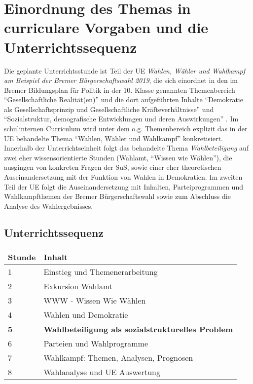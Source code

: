 


\section{Einordnung des Themas in curriculare Vorgaben und die Unterrichtssequenz}

Die geplante Unterrichtsstunde ist Teil der UE \emph{Wahlen, Wähler und
Wahlkampf am  Beispiel der Bremer Bürgerschaftswahl 2019}, die sich einordnet
in den im Bremer Bildungsplan für Politik in der 10. Klasse genannten
Themenbereich \enquote{Gesellschaftliche Realität(en)} und die dort
aufgeführten Inhalte \enquote{Demokratie als Gesellschaftsprinzip und
Gesellschaftliche Kräfteverhältnisse} und \enquote{Sozialstruktur,
demografische Entwicklungen und deren Auswirkungen} \cite[S.
35]{dersenatorfurbildungundwissenschaft2006}. Im schulinternen Curriculum wird
unter dem o.g. Themenbereich explizit das in der UE behandelte Thema
\enquote{Wahlen, Wähler und Wahlkampf} konkretisiert. Innerhalb der Unterrichtseinheit folgt das
behandelte Thema \emph{Wahlbeteiligung} auf zwei eher wissensorientierte
Stunden (Wahlamt, \enquote{Wissen wie Wählen}), die ausgingen von konkreten
Fragen der SuS, sowie einer eher theoretischen Auseinandersetzung mit der
Funktion von Wahlen in Demokratien. Im zweiten Teil der UE folgt die
Auseinandersetzung mit Inhalten, Parteiprogrammen und Wahlkampfthemen der
Bremer Bürgerschaftswahl sowie zum Abschluss die Analyse des Wahlergebnisses.


\subsection{Unterrichtssequenz}

\begin{footnotesize}

\begin{tabular}{|p{2cm}|p{12.75cm}|}
\hline
\textbf{Stunde} & \textbf{Inhalt}  \\
\hline
1 & Einstieg und Themenerarbeitung \\
\hline
2 & Exkursion Wahlamt \\
\hline
3 & WWW - Wissen Wie Wählen \\
\hline
4 & Wahlen und Demokratie \\
\hline
\rowcolor{Gray}
\textbf{5} & \textbf{Wahlbeteiligung als sozialstrukturelles Problem} \\
\hline
6 & Parteien und Wahlprogramme \\
\hline
7 & Wahlkampf: Themen, Analysen, Prognosen \\
\hline
8 & Wahlanalyse und UE Auswertung\\
\hline

\end{tabular}

\end{footnotesize}

\vspace{0.5cm}
